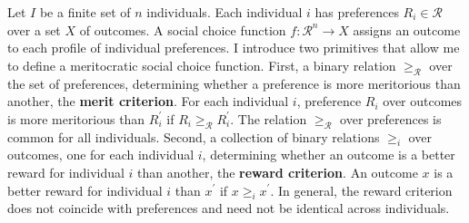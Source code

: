 Let \(I \) be a finite set of \( n \) individuals. Each individual \( i \) has preferences \( R_i \in \mathcal{R} \) over a set \( X \) of outcomes. A social choice function \( f \colon \mathcal{R}^{n} \rightarrow X \) assigns an outcome to each profile of individual preferences. I introduce two primitives that allow me to define a meritocratic social choice function. First, a binary relation \( \geq_{\mathcal{R}} \) over the set of preferences, determining whether a preference is more meritorious than another, the \textbf{merit criterion}. For each individual \( i \), preference \( R_i \) over outcomes is more meritorious than \( R^{\prime}_i \) if \( R_i \geq_{\mathcal{R}} R^{\prime}_i \). The relation \( \geq_{\mathcal{R}} \) over preferences is common for all individuals. Second, a collection of binary relations \( \geq_{i} \) over outcomes, one for each individual \( i \), determining whether an outcome is a better reward for individual \( i \) than another, the \textbf{reward criterion}. An outcome \( x \) is a better reward for individual \( i \) than \( x^{\prime} \) if \( x \geq_{i} x^{\prime} \). In general, the reward criterion does not coincide with preferences and need not be identical across individuals.


